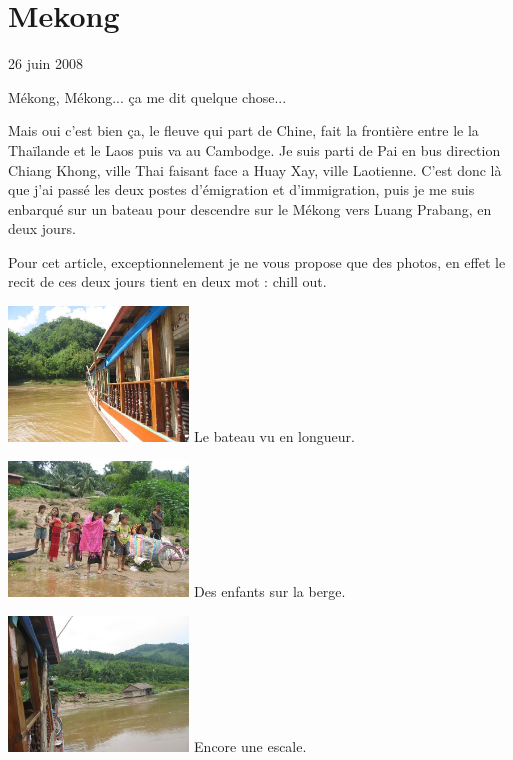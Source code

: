 \section{Mekong}

26 juin 2008

\begin{multicols}{2}

Mékong, Mékong... ça me dit quelque chose...

Mais oui c'est bien ça, le fleuve qui part de Chine, fait la frontière entre le la Thaïlande et le Laos puis va au Cambodge. Je suis parti de Pai en bus direction Chiang Khong, ville Thai faisant face a Huay Xay, ville Laotienne. C'est donc là que j'ai passé les deux postes d'émigration et d'immigration, puis je me suis enbarqué sur un bateau pour descendre sur le Mékong vers Luang Prabang, en deux jours.

Pour cet article, exceptionnelement je ne vous propose que des photos, en effet le recit de ces deux jours tient en deux mot : chill out.

\hspace*{-0.65cm}
\includegraphics[width=4.8cm]{articles/Mekong/1214473370zy1a.jpg}
Le bateau vu en longueur.

\hspace*{-0.65cm}
\includegraphics[width=4.8cm]{articles/Mekong/12144733896AMi.jpg}
Des enfants sur la berge.

\hspace*{-0.65cm}
\includegraphics[width=4.8cm]{articles/Mekong/1214473395mtro.jpg}
Encore une escale.


\end{multicols}
